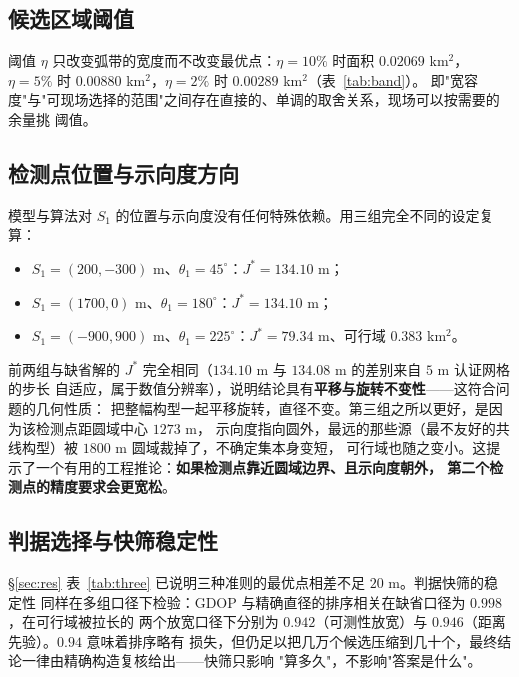 \subsection{候选区域阈值}

阈值 $\eta$ 只改变弧带的宽度而不改变最优点：$\eta=10\%$ 时面积 $0.02069$ km$^2$，
$\eta=5\%$ 时 $0.00880$ km$^2$，$\eta=2\%$ 时 $0.00289$ km$^2$（表~\ref{tab:band}）。
即"宽容度"与"可现场选择的范围"之间存在直接的、单调的取舍关系，现场可以按需要的余量挑
阈值。

\subsection{检测点位置与示向度方向}

模型与算法对 $S_1$ 的位置与示向度没有任何特殊依赖。用三组完全不同的设定复算：

\begin{itemize}
  \item $S_1=(200,-300)$ m、$\theta_1=45^\circ$：$J^*=134.10$ m；
  \item $S_1=(1700,0)$ m、$\theta_1=180^\circ$：$J^*=134.10$ m；
  \item $S_1=(-900,900)$ m、$\theta_1=225^\circ$：$J^*=79.34$ m、可行域 $0.383$ km$^2$。
\end{itemize}

前两组与缺省解的 $J^*$ 完全相同（$134.10$ m 与 $134.08$ m 的差别来自 $5$ m 认证网格的步长
自适应，属于数值分辨率），说明结论具有\textbf{平移与旋转不变性}——这符合问题的几何性质：
把整幅构型一起平移旋转，直径不变。第三组之所以更好，是因为该检测点距圆域中心 $1273$ m，
示向度指向圆外，最远的那些源（最不友好的共线构型）被 $1800$ m 圆域裁掉了，不确定集本身变短，
可行域也随之变小。这提示了一个有用的工程推论：\textbf{如果检测点靠近圆域边界、且示向度朝外，
第二个检测点的精度要求会更宽松}。

\subsection{判据选择与快筛稳定性}

§\ref{sec:res} 表~\ref{tab:three} 已说明三种准则的最优点相差不足 $20$ m。判据快筛的稳定性
同样在多组口径下检验：GDOP 与精确直径的排序相关在缺省口径为 $0.998$，在可行域被拉长的
两个放宽口径下分别为 $0.942$（可测性放宽）与 $0.946$（距离先验）。$0.94$ 意味着排序略有
损失，但仍足以把几万个候选压缩到几十个，最终结论一律由精确构造复核给出——快筛只影响
"算多久"，不影响"答案是什么"。
